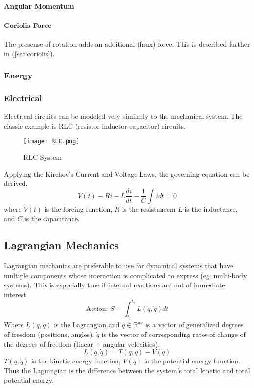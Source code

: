 \documentclass[../notes.tex]{subfiles}
\begin{document}
\paragraph{Angular Momentum}
\paragraph{Coriolis Force}
The presense of rotation adds an additional (faux) force. This is described further in (\underline{\ref{sec:coriolis}}).
\subsubsection{Energy}
\subsubsection{Electrical}

Electrical circuits can be modeled very similarly to the mechanical system. The classic example is RLC (resistor-inductor-capacitor) circuits.

\begin{figure}[H]
    \centering
    \texttt{[image: RLC.png]}
    \caption{RLC System}
    \label{fig:RLC}
\end{figure}

Applying the Kirchov's Current and Voltage Laws, the governing equation can be derived.
\begin{equation}
    V(t) - Ri - L\frac{di}{dt} - \frac{1}{C}\int idt = 0
\end{equation}
where $V(t)$ is the forcing function, $R$ is the resistancem $L$ is the inductance, and $C$ is the capacitance.

\subsection{Lagrangian Mechanics}
Lagrangian mechanics are preferable to use for dynamical systems that have multiple components whose interaction is complicated to express (eg. multi-body systems). This is especially true if internal reactions are not of immediate interest.
\begin{equation} \label{eq:lagrangian}
    \text{Action: } S = \int_{t_1}^{t_2} L(q, \dot{q})dt
\end{equation}
Where $L(q, \dot{q})$ is the Lagrangian and $q\in \mathbb{R}^{nq}$ is a vector of generalized degrees of freedom (positions, angles). $\dot{q}$ is the vector of corresponding rates of change of the degrees of freedom (linear + angular velocities).
\begin{equation}
    L(q, \dot{q}) = T(q, \dot{q}) - V(q)
\end{equation}
$T(q, \dot{q})$ is the kinetic energy function, $V(q)$ is the potential energy function. Thus the Lagrangian is the difference between the system's total kinetic and total potential energy.
\end{document}
